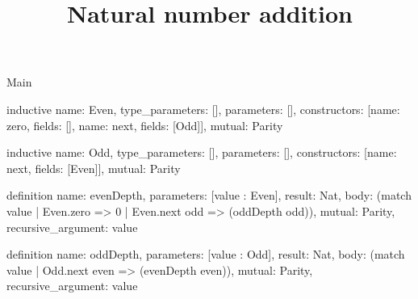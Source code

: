 \begin{lexlean}{Main}
\title{Natural number addition}
\begin{semanticmodule}
inductive{
  name: Even,
  type_parameters: [],
  parameters: [],
  constructors: [{name: zero, fields: []}, {name: next, fields: [Odd]}],
  mutual: Parity
}

inductive{
  name: Odd,
  type_parameters: [],
  parameters: [],
  constructors: [{name: next, fields: [Even]}],
  mutual: Parity
}

definition{
  name: evenDepth,
  parameters: [value : Even],
  result: Nat,
  body: (match value | Even.zero => 0 | Even.next odd => (oddDepth odd)),
  mutual: Parity,
  recursive_argument: value
}

definition{
  name: oddDepth,
  parameters: [value : Odd],
  result: Nat,
  body: (match value | Odd.next even => (evenDepth even)),
  mutual: Parity,
  recursive_argument: value
}
\end{semanticmodule}
\end{lexlean}
